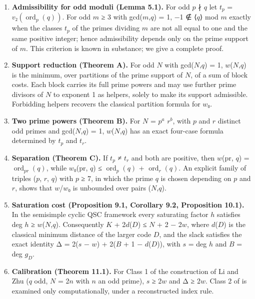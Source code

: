 \documentclass[pdflatex,sn-mathphys-num]{sn-jnl}
\providecommand{\tightlist}{\setlength{\itemsep}{0pt}\setlength{\parskip}{0pt}}
\theoremstyle{thmstyleone}
\theoremstyle{thmstylethree}
\begin{document}
\begin{enumerate}
\def\labelenumi{\arabic{enumi}.}
\tightlist
\item
  \textbf{Admissibility for odd moduli (Lemma 5.1).} For odd \(p\) ∤ \(q\) let \(t_p\) = \(v₂(\operatorname{ord}_p(q))\). For odd \(m\) ≥ 3 with gcd(\(m\),\(q\)) = 1, −1 ∉ ⟨\(q\)⟩ mod \(m\) exactly when the classes \(t_p\) of the primes dividing \(m\) are not all equal to one and the same positive integer; hence admissibility depends only on the prime support of \(m\). This criterion is known in substance; we give a complete proof.
\item
  \textbf{Support reduction (Theorem A).} For odd \(N\) with gcd(\(N\),\(q\)) = 1, \(w\)(\(N\),\(q\)) is the minimum, over partitions of the prime support of \(N\), of a sum of block costs. Each block carries its full prime powers and may use further prime divisors of \(N\) to exponent 1 as helpers, solely to make its support admissible. Forbidding helpers recovers the classical partition formula for \(w\)₀.
\item
  \textbf{Two prime powers (Theorem B).} For \(N\) = \(p^a\) \(r^b\), with \(p\) and \(r\) distinct odd primes and gcd(\(N\),\(q\)) = 1, \(w\)(\(N\),\(q\)) has an exact four-case formula determined by \(t_p\) and \(t_r\).
\item
  \textbf{Separation (Theorem C).} If \(t_p\) ≠ \(t_r\) and both are positive, then \(w\)(pr, \(q\)) = \(\operatorname{ord}_{pr}(q)\), while \(w\)₀(pr, \(q\)) ≤ \(\operatorname{ord}_p(q)\) + \(\operatorname{ord}_r(q)\). An explicit family of triples (\(p\), \(r\), \(q\)) with \(p\) ≥ 7, in which the prime \(q\) is chosen depending on \(p\) and \(r\), shows that \(w\)/\(w\)₀ is unbounded over pairs (\(N\),\(q\)).
\item
  \textbf{Saturation cost (Proposition 9.1, Corollary 9.2, Proposition 10.1).} In the semisimple cyclic QSC framework every saturating factor \(h\) satisfies deg \(h\) ≥ \(w\)(\(N\),\(q\)). Consequently \(K\) + 2\(d\)(\(D\)) ≤ \(N\) + 2 − 2\(w\), where \(d\)(\(D\)) is the classical minimum distance of the larger code \(D\), and the slack satisfies the exact identity Δ = 2(\(s\) − \(w\)) + 2(\(B\) + 1 − \(d\)(\(D\))), with \(s\) = deg \(h\) and \(B\) = deg \(g_D\).
\item
  \textbf{Calibration (Theorem 11.1).} For Class 1 of the construction of Li and Zhu \cite{LZ22} (\(q\) odd, \(N\) = 2\(n\) with \(n\) an odd prime), \(s\) ≥ 2\(w\) and Δ ≥ 2\(w\). Class 2 of \cite{LZ22} is examined only computationally, under a reconstructed index rule.
\end{enumerate}
\end{document}
